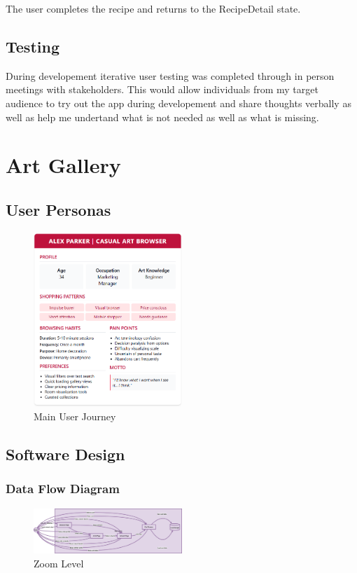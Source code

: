 \documentclass[]{project_final}
\begin{document}
The user completes the recipe and returns to the RecipeDetail state.
\newpage




\subsection{Testing}
During developement iterative user testing was completed through in person meetings with stakeholders. This would allow individuals from my target audience to try out the app during developement and share thoughts verbally as well as help me undertand what is not needed as well as what is missing.



\newpage
\section{Art Gallery}
\subsection{User Personas}
\begin{figure}[ht!]
    \centering
    \includegraphics[width=0.5\textwidth]{alex.png}
    \vspace*{0.0cm}
    \caption{Main User Journey}
    \label{fig:1}
\end{figure}


\subsection{Software Design}
\subsubsection{Data Flow Diagram}
\begin{figure}[ht!]
    \centering
    \includegraphics[width=0.5\textwidth]{DataFlowDiagram.png}
    \vspace*{0.0cm}
    \caption{Zoom Level}
    \label{fig:1}
\end{figure}
\end{document}
